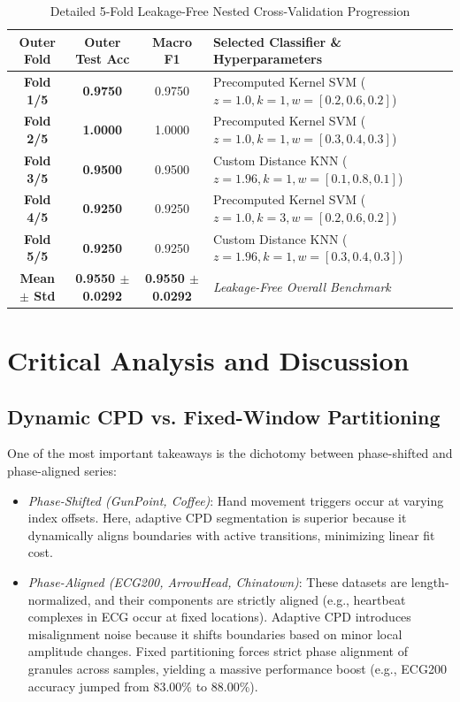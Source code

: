 \documentclass[conference]{IEEEtran}
\begin{document}
\begin{table}[htbp]
\caption{Detailed 5-Fold Leakage-Free Nested Cross-Validation Progression}
\label{tab:nested_cv_progression}
\centering
\begin{tabular}{|c|c|c|l|}
\hline
Outer Fold & Outer Test Acc & Macro F1 & Selected Classifier \& Hyperparameters \\ \hline
\textbf{Fold 1/5} & \textbf{0.9750} & 0.9750 & Precomputed Kernel SVM ($z=1.0, k=1, w=[0.2, 0.6, 0.2]$) \\ \hline
\textbf{Fold 2/5} & \textbf{1.0000} & 1.0000 & Precomputed Kernel SVM ($z=1.0, k=1, w=[0.3, 0.4, 0.3]$) \\ \hline
\textbf{Fold 3/5} & \textbf{0.9500} & 0.9500 & Custom Distance KNN ($z=1.96, k=1, w=[0.1, 0.8, 0.1]$) \\ \hline
\textbf{Fold 4/5} & \textbf{0.9250} & 0.9250 & Precomputed Kernel SVM ($z=1.0, k=3, w=[0.2, 0.6, 0.2]$) \\ \hline
\textbf{Fold 5/5} & \textbf{0.9250} & 0.9250 & Custom Distance KNN ($z=1.96, k=1, w=[0.3, 0.4, 0.3]$) \\ \hline
\textbf{Mean $\pm$ Std} & \textbf{0.9550 $\pm$ 0.0292} & \textbf{0.9550 $\pm$ 0.0292} & \textit{Leakage-Free Overall Benchmark} \\ \hline
\end{tabular}
\end{table}

\section{Critical Analysis and Discussion}

\subsection{Dynamic CPD vs. Fixed-Window Partitioning}
One of the most important takeaways is the dichotomy between phase-shifted and phase-aligned series:
\begin{itemize}
    \item \textit{Phase-Shifted (GunPoint, Coffee)}: Hand movement triggers occur at varying index offsets. Here, adaptive CPD segmentation is superior because it dynamically aligns boundaries with active transitions, minimizing linear fit cost. 
    \item \textit{Phase-Aligned (ECG200, ArrowHead, Chinatown)}: These datasets are length-normalized, and their components are strictly aligned (e.g., heartbeat complexes in ECG occur at fixed locations). Adaptive CPD introduces misalignment noise because it shifts boundaries based on minor local amplitude changes. Fixed partitioning forces strict phase alignment of granules across samples, yielding a massive performance boost (e.g., ECG200 accuracy jumped from 83.00\% to 88.00\%).
\end{itemize}
\end{document}
